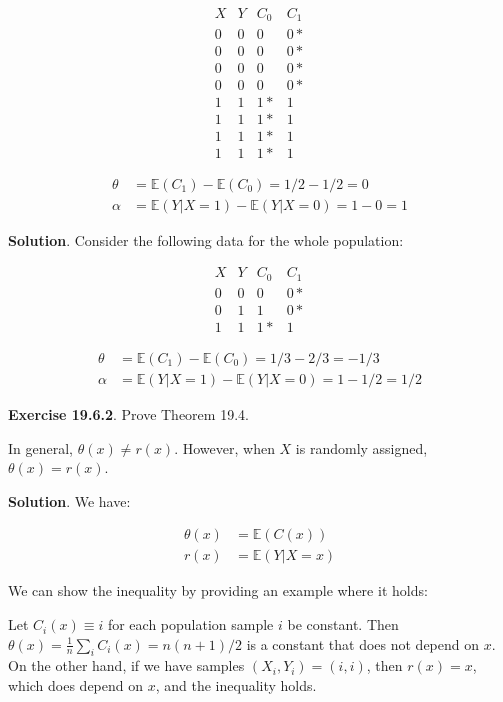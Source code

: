 \[
\begin{array}{cccc}
X & Y & C_0 & C_1 \\
\hline
0 & 0 & 0 & 0* \\
0 & 0 & 0 & 0* \\
0 & 0 & 0 & 0* \\
0 & 0 & 0 & 0* \\
\hline
1 & 1 & 1* & 1 \\
1 & 1 & 1* & 1 \\
1 & 1 & 1* & 1 \\
1 & 1 & 1* & 1
\end{array}
\]

\[ 
\begin{align}
\theta &= \mathbb{E}(C_1) - \mathbb{E}(C_0) = 1/2 - 1/2 = 0 \\
\alpha &= \mathbb{E}(Y | X = 1) - \mathbb{E}(Y | X = 0) = 1 - 0 = 1
\end{align}
\]

\textbf{Solution}. Consider the following data for the whole population:

\[
\begin{array}{cccc}
X & Y & C_0 & C_1 \\
\hline
0 & 0 & 0 & 0* \\
0 & 1 & 1 & 0* \\
\hline
1 & 1 & 1* & 1
\end{array}
\]

\[ 
\begin{align}
\theta &= \mathbb{E}(C_1) - \mathbb{E}(C_0) = 1/3 - 2/3 = -1/3 \\
\alpha &= \mathbb{E}(Y | X = 1) - \mathbb{E}(Y | X = 0) = 1 - 1/2 = 1/2
\end{align}
\]

\textbf{Exercise 19.6.2}. Prove Theorem 19.4.

In general, \(\theta(x) \neq r(x)\). However, when \(X\) is randomly
assigned, \(\theta(x) = r(x)\).

\textbf{Solution}. We have:

\[
\begin{align}
\theta(x) &= \mathbb{E}(C(x)) \\
r(x) &= \mathbb{E}(Y | X = x)
\end{align}
\]

We can show the inequality by providing an example where it holds:

Let \(C_i(x) \equiv i\) for each population sample \(i\) be constant.
Then \(\theta(x) = \frac{1}{n} \sum_i C_i(x) = n (n+1) / 2\) is a
constant that does not depend on \(x\). On the other hand, if we have
samples \((X_i, Y_i) = (i, i)\), then \(r(x) = x\), which does depend on
\(x\), and the inequality holds.

